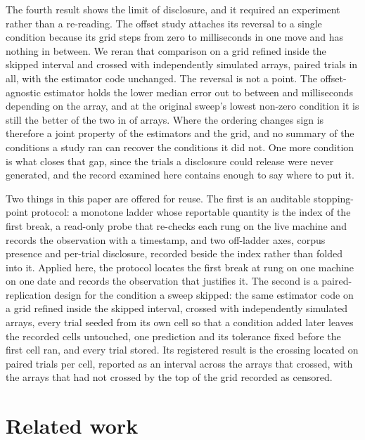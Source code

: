The fourth result shows the limit of disclosure, and it required an experiment
rather than a re-reading. The offset study attaches its reversal to a single
condition because its grid steps from zero to \CoarseGapHigh{} milliseconds in
one move and has nothing in between. We reran
that comparison on a grid refined inside the skipped interval and crossed with
\FineRooms{} independently simulated arrays, \FinePairs{} paired trials in all,
with the estimator code unchanged. The reversal is not a point. The
offset-agnostic estimator holds the lower median error out to between
\ReversalLow{} and \ReversalHigh{} milliseconds depending on the array, and at
the original sweep's lowest non-zero condition it is still the better of the two
in \AnchorAgnosticRooms{} of \FineRooms{} arrays. Where the ordering changes sign
is therefore a joint property of the estimators and the grid, and no summary of
the conditions a study ran can recover the conditions it did not. One more
condition is what closes that gap, since the trials a disclosure could release
were never generated, and the record examined here contains enough to say where
to put it.

Two things in this paper are offered for reuse. The first is an auditable
stopping-point protocol: a monotone ladder whose reportable quantity is the
index of the first break, a read-only probe that re-checks each rung on the live
machine and records the observation with a timestamp, and two off-ladder axes,
corpus presence and per-trial disclosure, recorded beside the index rather than
folded into it. Applied here, the protocol locates the first break at rung
\FirstBreak{} on one machine on one date and records the observation that
justifies it. The second is a paired-replication design for the condition a
sweep skipped: the same estimator code on a grid refined inside the skipped
interval, crossed with independently simulated arrays, every trial seeded from
its own cell so that a condition added later leaves the recorded cells
untouched, one prediction and its tolerance fixed before the first cell ran, and
every trial stored. Its registered result is the crossing located on
\FineTrials{} paired trials per cell, reported as an interval across the arrays
that crossed, with the arrays that had not crossed by the top of the grid
recorded as censored.

\section{Related work}

